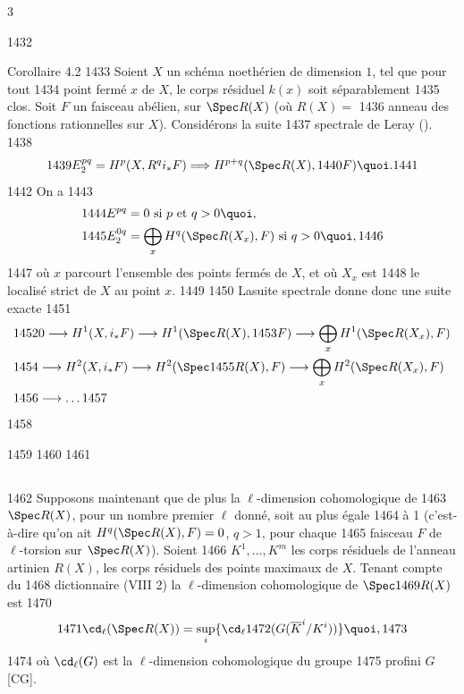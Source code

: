 3	\documentclass[10pt]{../fichiers-configuration-latex/smfart}
\begin{document}
  1432	\begin{enonce*}{Corollaire 4.2}
  1433	Soient $X$ un schéma noethérien de dimension $1$, tel que pour tout
  1434	point fermé $x$ de $X$, le corps résiduel $k(x)$ soit séparablement
  1435	clos. Soit $F$ un faisceau abélien, sur $\Spec R(X)$ (où $R(X)=$
  1436	anneau des fonctions rationnelles sur $X$). Considérons la suite
  1437	spectrale de Leray (\quad).
  1438	$$
  1439	E^{pq}_2=H^p(X,R^q i_{\ast}F)\Longrightarrow H^{p+q}(\Spec R(X),
  1440	F){\quoi}.
  1441	$$
  1442	On a
  1443	\begin{align*}
  1444	E^{pq} &= 0\mbox{ si } p \mbox{ et } q> 0{\quoi},\\
  1445	E^{0q}_2 &= \bigoplus_x H^q(\Spec R(X_x),F)\mbox{ si } q>0{\quoi},
  1446	\end{align*}
  1447	où $x$ parcourt l'ensemble des points fermés de $X$, et où $X_x$ est
  1448	le localisé strict de $X$ au point $x$.
  1449	
  1450	La\pageoriginale suite spectrale donne donc une suite exacte
  1451	\begin{align*}
  1452	& 0\longrightarrow H^1(X,i_{\ast}F)\longrightarrow H^1(\Spec R(X),
  1453	F)\longrightarrow \bigoplus_x H^1(\Spec R(X_x),F)\\
  1454	& \longrightarrow H^2(X,i_{\ast}F)\longrightarrow H^2(\Spec
  1455	R(X),F)\longrightarrow \bigoplus_x H^2(\Spec R(X_x),F)\\
  1456	&\longrightarrow\ldots
  1457	\end{align*}
  1458	\end{enonce*}
  1459	
  1460	\setcounter{subsection}{2}
  1461	\subsection{}
  1462	Supposons maintenant que de plus la $\ell$-dimension cohomologique de
  1463	$\Spec R(X)$, pour un nombre premier $\ell$ donné, soit au plus égale
  1464	à 1 (c'est-à-dire qu'on ait $H^q(\Spec R(X), F)=0$, $q>1$, pour chaque
  1465	faisceau $F$ de $\ell$-torsion sur $\Spec R(X)$). Soient
  1466	$K^1,\ldots,K^m$ les corps résiduels de l'anneau artinien $R(X)$, 	les corps résiduels des points maximaux de $X$. Tenant compte du
  1468	dictionnaire (VIII 2) la $\ell$-dimension cohomologique de $\Spec
  1469	R(X)$ est
  1470	$$
  1471	\cd_{\ell}(\Spec R(X))=\mathop{\sup}_i \{\cd_{\ell}
  1472	(G(\overline{K}^{i}/K^{i}))\}{\quoi},
  1473	$$
  1474	où $\cd_{\ell}(G)$ est la $\ell$-dimension cohomologique du groupe
  1475	profini $G$ [\cf CG].
\end{document}

